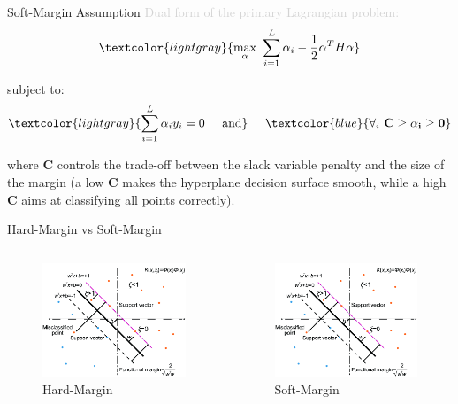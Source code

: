 \begin{frame}[fragile]{Soft-Margin Assumption}
  \textcolor{lightgray}{Dual form of the primary Lagrangian problem:}
  \newline
  \begin{equation*}
    \begin{split}
      \textcolor{lightgray}{\max_{\alpha}\ \sum_{i=1}^{L} \alpha_i - \frac{1}{2} \alpha^T H \alpha}
    \end{split}
  \end{equation*}

  subject to:
  \newline
  \begin{equation*}
    \textcolor{lightgray}{\sum_{i=1}^{L} \alpha_i y_i = 0 \hspace{.5cm} \text{and}}
    \hspace{.5cm} 
    \textcolor{blue}{\forall_i\ \mathbf{C \geq \alpha_i \geq 0}}
  \end{equation*}

  \vspace{.3cm}

  where $\mathbf{C}$ controls the trade-off between the slack variable penalty 
  and the size of the margin (a low $\mathbf{C}$ makes the hyperplane decision 
  surface smooth, while a high $\mathbf{C}$ aims at classifying all points correctly).
\end{frame}

\begin{frame}[fragile]{Hard-Margin vs Soft-Margin}
  \begin{columns}[onlytextwidth, T, c]
    \begin{column}{.5\textwidth}
        \begin{figure}
            \includegraphics[width=5cm]{assets/images/test.png}
            \caption{Hard-Margin}
        \end{figure}
    \end{column}
    \begin{column}{.5\textwidth}
        \begin{figure}
            \includegraphics[width=5cm]{assets/images/test.png}
            \caption{Soft-Margin}
        \end{figure}
    \end{column}    
  \end{columns}
\end{frame}
